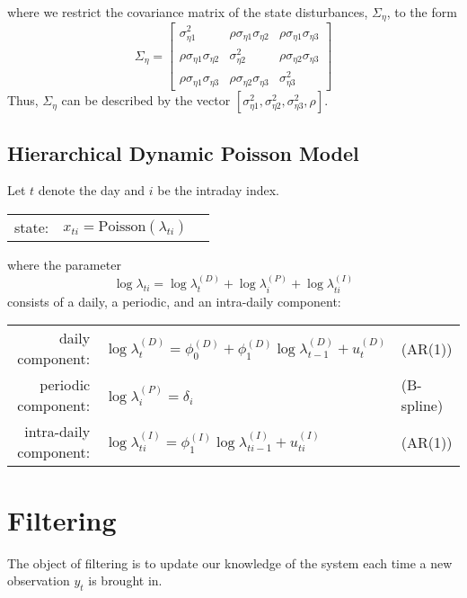 \documentclass[11pt, oneside]{scrreprt}   	%
\begin{document}
where we restrict the covariance matrix of the state disturbances, $\Sigma_{\eta}$, to the form
$$
\Sigma_{\eta} = 
\begin{bmatrix}
\sigma_{\eta 1}^2 & \rho \sigma_{\eta 1} \sigma_{\eta 2} & \rho \sigma_{\eta 1} \sigma_{\eta 3}
\\ \rho \sigma_{\eta 1} \sigma_{\eta 2} & \sigma_{\eta 2}^2 & \rho \sigma_{\eta 2} \sigma_{\eta 3}
\\ \rho \sigma_{\eta 1} \sigma_{\eta 3} & \rho \sigma_{\eta 2} \sigma_{\eta 3} & \sigma_{\eta 3}^2
\end{bmatrix}
$$
Thus, $\Sigma_{\eta}$ can be described by the vector $[\sigma_{\eta 1}^2, \sigma_{\eta 2}^2, \sigma_{\eta 3}^2, \rho]$.


\section{Hierarchical Dynamic Poisson Model}
Let $t$ denote the day and $i$ be the intraday index.

\begin{center}
\begin{tabular}{ r r l }
  state: & $x_{ti} = \text{Poisson}(\lambda_{ti})$\\
\end{tabular}
\end{center}

where the parameter
$$
\log \lambda_{ti} = \log \lambda_t^{(D)} + \log \lambda_i^{(P)} + \log \lambda_{ti}^{(I)}  
$$
consists of a daily, a periodic, and an intra-daily component:
\begin{center}
\begin{tabular}{ r l l }
  daily component: & $\log \lambda_t^{(D)} = \phi_0^{(D)} + \phi_1^{(D)} \log \lambda_{t-1}^{(D)}  + u_t^{(D)}$ & (AR(1)) \\
  periodic component: & $\log \lambda_i^{(P)} = \delta_i$ & (B-spline) \\
  intra-daily component: & $\log \lambda_{ti}^{(I)} = \phi_1^{(I)} \log \lambda_{ti-1}^{(I)}  + u_{ti}^{(I)}$ & (AR(1)) \\
\end{tabular}
\end{center}


\chapter{Filtering}
\label{chp:filtering}
The object of filtering is to update our knowledge of the system each time a new observation $y_t$ is brought in.
\end{document}
